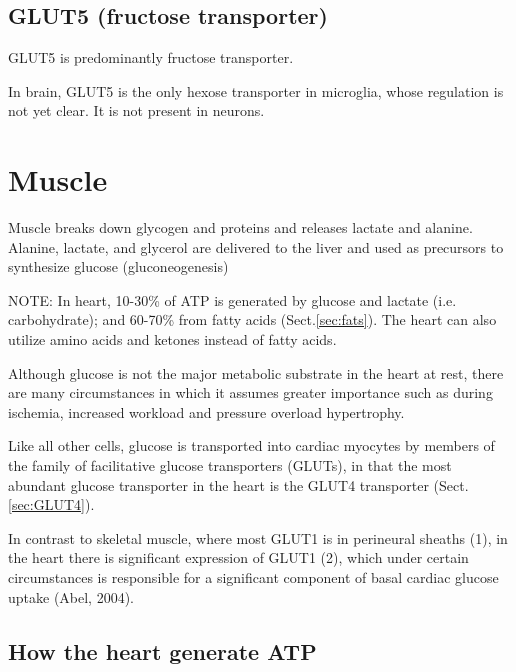 \subsection{GLUT5 (fructose transporter)}
\label{sec:GLUT5}

GLUT5 is predominantly fructose transporter. 

 In brain, GLUT5 is the only hexose transporter in microglia, whose regulation
is not yet clear. It is not present in neurons.

\section{Muscle}
\label{sec:heart-energy-substrate}

Muscle breaks down glycogen and proteins and releases lactate and alanine.
Alanine, lactate, and glycerol are delivered to the liver and used as precursors
to synthesize glucose (gluconeogenesis)

NOTE: In heart, 10-30\% of ATP is generated by glucose and lactate (i.e.
carbohydrate); and 60-70\% from fatty acids (Sect.\ref{sec:fats}). The heart can
also utilize amino acids and ketones instead of fatty acids.

Although glucose is not the major metabolic substrate in the heart at rest,
there are many circumstances in which it assumes greater importance such as
during ischemia, increased workload and pressure overload hypertrophy.

Like all other cells, glucose is transported into cardiac myocytes by members
of the family of facilitative glucose transporters (GLUTs), in that
the most abundant glucose transporter in the heart is the GLUT4 transporter
(Sect.\ref{sec:GLUT4}).

In contrast to skeletal muscle, where most GLUT1 is in perineural sheaths (1),
in the heart there is significant expression of GLUT1 (2), which under certain
circumstances is responsible for a significant component of basal cardiac
glucose uptake (Abel, 2004).   

\subsection{How the heart generate ATP}


